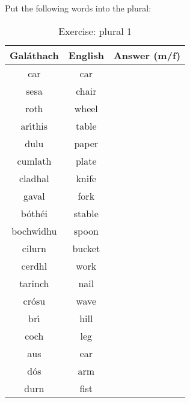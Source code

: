 Put the following words into the plural:
\begin{table}[H]
\centering
\begin{tabular}{|c|c|M{10.0cm}|}
  \toprule
  \textbf{Gal\'{a}thach} & \textbf{English} & \textbf{Answer (m/f)}\\
  \toprule
  car & car & \\
  \midrule
  sesa & chair & \\
  \midrule
  roth & wheel & \\
  \midrule
  ar\'{\i}this & table & \\
  \midrule
  dulu & paper & \\
  \midrule
  cumlath & plate & \\
  \midrule
  cladhal & knife & \\
  \midrule
  gaval & fork & \\
  \midrule
  b\'{o}th\'{e}i & stable & \\
  \midrule
  bochw\'{\i}dhu & spoon & \\
  \midrule
  cilurn & bucket & \\
  \midrule
  cerdhl & work & \\
  \midrule
  tarinch & nail & \\
  \midrule
  cr\'{o}su & wave & \\
  \midrule
  br\'{\i} & hill & \\
  \midrule
  coch & leg & \\
  \midrule
  aus & ear & \\
  \midrule
  d\'{o}s & arm & \\
  \midrule
  durn & fist & \\
  \bottomrule
\end{tabular}
\label{exercise_plural_1}
\caption{Exercise: plural 1}
\end{table}

\newpage
